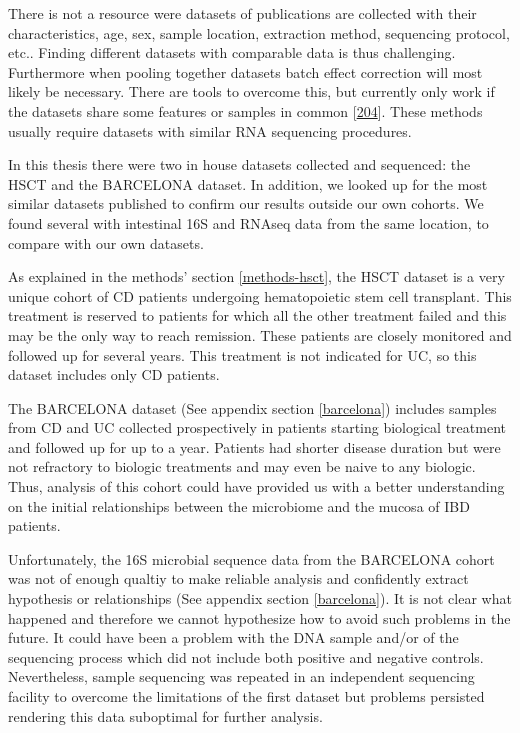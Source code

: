 \documentclass[
  12pt,
  a4paper,
  twoside,
  openright]{book}
\begin{document}
There is not a resource were datasets of publications are collected with their characteristics, age, sex, sample location, extraction method, sequencing protocol, etc..
Finding different datasets with comparable data is thus challenging.
Furthermore when pooling together datasets batch effect correction will most likely be necessary.
There are tools to overcome this, but currently only work if the datasets share some features or samples in common {[}\protect\hyperlink{ref-ugidos2020}{204}{]}.
These methods usually require datasets with similar RNA sequencing procedures.

In this thesis there were two in house datasets collected and sequenced: the HSCT and the BARCELONA dataset.
In addition, we looked up for the most similar datasets published to confirm our results outside our own cohorts.
We found several with intestinal 16S and RNAseq data from the same location, to compare with our own datasets.

As explained in the methods' section \ref{methods-hsct}, the HSCT dataset is a very unique cohort of CD patients undergoing hematopoietic stem cell transplant.
This treatment is reserved to patients for which all the other treatment failed and this may be the only way to reach remission.
These patients are closely monitored and followed up for several years.
This treatment is not indicated for UC, so this dataset includes only CD patients.

The BARCELONA dataset (See appendix section \ref{barcelona}) includes samples from CD and UC collected prospectively in patients starting biological treatment and followed up for up to a year.
Patients had shorter disease duration but were not refractory to biologic treatments and may even be naive to any biologic.
Thus, analysis of this cohort could have provided us with a better understanding on the initial relationships between the microbiome and the mucosa of IBD patients.

Unfortunately, the 16S microbial sequence data from the BARCELONA cohort was not of enough qualtiy to make reliable analysis and confidently extract hypothesis or relationships (See appendix section \ref{barcelona}).
It is not clear what happened and therefore we cannot hypothesize how to avoid such problems in the future.
It could have been a problem with the DNA sample and/or of the sequencing process which did not include both positive and negative controls.
Nevertheless, sample sequencing was repeated in an independent sequencing facility to overcome the limitations of the first dataset but problems persisted rendering this data suboptimal for further analysis.
\end{document}
